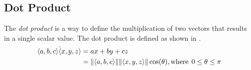 \subsection{Dot Product}\label{subsec:Vector_Dot_Product}
\begin{definition}\label{def:Dot_Product}
  The \emph{dot product} is a way to define the multiplication of two vectors that results in a single scalar value.
  The dot product is defined as shown in .
  \begin{equation}\label{eq:Dot_Product}
    \begin{aligned}
      \langle a, b, c \rangle \dot \langle x, y, z \rangle &= ax + by + cz \\
      &= \lVert \langle a, b, c \rangle \rVert \lVert \langle x, y, z \rangle \rVert \cos(\theta), \text{where} \:\: 0 \leq \theta \leq \pi \\
    \end{aligned}
  \end{equation}
\end{definition}



